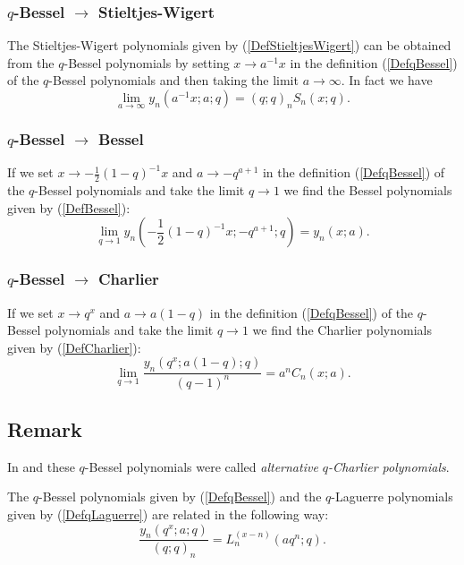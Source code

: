 \documentclass[envcountchap,graybox]{svmono}
\newcounter{rom}
\begin{document}
{{\subsubsection*{$q$-Bessel $\rightarrow$ Stieltjes-Wigert}
The Stieltjes-Wigert polynomials given by (\ref{DefStieltjesWigert}) can be obtained
from the $q$-Bessel polynomials by setting $x\rightarrow a^{-1}x$ in the definition
(\ref{DefqBessel}) of the $q$-Bessel polynomials and then taking the limit
$a\rightarrow\infty$. In fact we have
\begin{equation}
\lim_{a\rightarrow\infty}y_n(a^{-1}x;a;q)=(q;q)_nS_n(x;q).
\end{equation}

\subsubsection*{$q$-Bessel $\rightarrow$ Bessel}
If we set $x\rightarrow -\frac{1}{2}(1-q)^{-1}x$ and $a\rightarrow -q^{a+1}$ in the definition
(\ref{DefqBessel}) of the $q$-Bessel polynomials and take the limit $q\rightarrow 1$
we find the Bessel polynomials given by (\ref{DefBessel}):
\begin{equation}
\lim_{q\rightarrow 1}y_n(-\textstyle\frac{1}{2}(1-q)^{-1}x;-q^{a+1};q)=y_n(x;a).
\end{equation}

\subsubsection*{$q$-Bessel $\rightarrow$ Charlier}
If we set $x\rightarrow q^x$ and $a\rightarrow a(1-q)$ in the definition (\ref{DefqBessel})
of the $q$-Bessel polynomials and take the limit $q\rightarrow 1$ we find the Charlier
polynomials given by (\ref{DefCharlier}):
\begin{equation}
\lim_{q\rightarrow 1}\frac{y_n(q^x;a(1-q);q)}{(q-1)^n}=a^nC_n(x;a).
\end{equation}

\subsection*{Remark}
In \cite{Koekoek94} and \cite{Koekoek98} these $q$-Bessel polynomials were called
\emph{alternative $q$-Charlier polynomials}.

\noindent
The $q$-Bessel polynomials given by (\ref{DefqBessel}) and the $q$-Laguerre
polynomials given by (\ref{DefqLaguerre}) are related in the following way:
$$\frac{y_n(q^x;a;q)}{(q;q)_n}=L_n^{(x-n)}(aq^n;q).$$

}}
\end{document}
